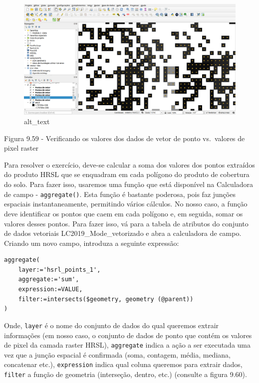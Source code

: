 \documentclass[
]{book}
\begin{document}
\begin{figure}
\centering
\includegraphics{media/modulo9/fig959.png}
\caption{alt\_text}
\end{figure}

Figura 9.59 - Verificando os valores dos dados de vetor de ponto vs.~valores de pixel raster

Para resolver o exercício, deve-se calcular a soma dos valores dos pontos extraídos do produto HRSL que se enquadram em cada polígono do produto de cobertura do solo. Para fazer isso, usaremos uma função que está disponível na Calculadora de campo - \texttt{aggregate()}. Esta função é bastante poderosa, pois faz junções espaciais instantaneamente, permitindo vários cálculos. No nosso caso, a função deve identificar os pontos que caem em cada polígono e, em seguida, somar os valores desses pontos. Para fazer isso, vá para a tabela de atributos do conjunto de dados vetoriais LC2019\_Mode\_vetorizado e abra a calculadora de campo. Criando um novo campo, introduza a seguinte expressão:

\begin{verbatim}
aggregate(
    layer:='hsrl_points_1',
    aggregate:='sum',
    expression:=VALUE,
    filter:=intersects($geometry, geometry (@parent))
)
\end{verbatim}

Onde, \texttt{layer} é o nome do conjunto de dados do qual queremos extrair informações (em nosso caso, o conjunto de dados de ponto que contém os valores de pixel da camada raster HRSL), \texttt{aggregate} indica a ação a ser executada uma vez que a junção espacial é confirmada (soma, contagem, média, mediana, concatenar etc.), \texttt{expression} indica qual coluna queremos para extrair dados, \texttt{filter} a função de geometria (interseção, dentro, etc.) (consulte a figura 9.60).
\end{document}
